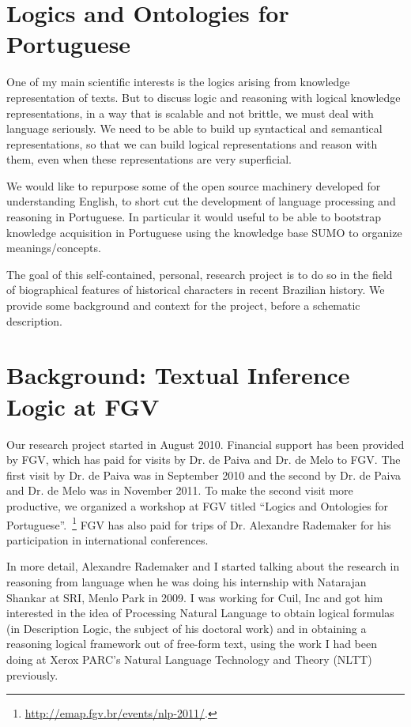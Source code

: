 \section{Logics and Ontologies for Portuguese}

One of my main scientific interests is the logics arising from
knowledge representation of texts.  But to discuss logic and reasoning
with logical knowledge representations, in a way that is scalable and
not brittle, we must deal with language seriously. We need to be able
to build up syntactical and semantical representations, so that we can
build logical representations and reason with them, even when these
representations are very superficial.

We would like to repurpose some of the open source machinery developed
for understanding English, to short cut the development of language
processing and reasoning in Portuguese. In particular it would useful
to be able to bootstrap knowledge acquisition in Portuguese using the
knowledge base SUMO to organize meanings/concepts.

The goal of this self-contained, personal, research project is to do
so in the field of biographical features of historical characters in
recent Brazilian history. We provide some background and context for
the project, before a schematic description.


\section{Background: Textual Inference Logic at FGV}

Our research project started in August 2010. Financial support has
been provided by FGV, which has paid for visits by Dr. de Paiva and
Dr. de Melo to FGV.  The first visit by Dr. de Paiva was in September
2010 and the second by Dr. de Paiva and Dr. de Melo was in November
2011. To make the second visit more productive, we organized a
workshop at FGV titled ``Logics and Ontologies for
Portuguese''.~\footnote{\url{http://emap.fgv.br/events/nlp-2011/}.}
FGV has also paid for trips of Dr. Alexandre Rademaker for his
participation in international conferences.

In more detail, Alexandre Rademaker and I started talking about the
research in reasoning from language when he was doing his internship
with Natarajan Shankar at SRI, Menlo Park in 2009. I was working for
Cuil, Inc and got him interested in the idea of Processing Natural
Language to obtain logical formulas (in Description Logic, the subject
of his doctoral work) and in obtaining a reasoning logical framework
out of free-form text, using the work I had been doing at Xerox PARC's
Natural Language Technology and Theory (NLTT) previously.

